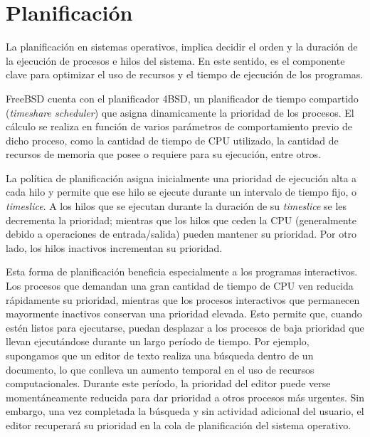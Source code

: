 \section{Planificación}

La planificación en sistemas operativos, implica decidir el orden y la duración de la ejecución de procesos e hilos del sistema. En este sentido, es el componente clave para optimizar el uso de recursos y el tiempo de ejecución de los programas.\par

FreeBSD cuenta con el planificador 4BSD, un planificador de tiempo compartido (\textit{timeshare scheduler}) que asigna dinamicamente la prioridad de los procesos. El cálculo se realiza en función de varios parámetros de comportamiento previo de dicho proceso, como la cantidad de tiempo de CPU utilizado, la cantidad de recursos de memoria que posee o requiere para su ejecución, entre otros.\par

La política de planificación asigna inicialmente una prioridad de ejecución alta a cada hilo y permite que ese hilo se ejecute durante un intervalo de tiempo fijo, o \textit{timeslice}. A los hilos que se ejecutan durante la duración de su \textit{timeslice} se les decrementa la prioridad; mientras que los hilos que ceden la CPU (generalmente debido a operaciones de entrada/salida) pueden mantener su prioridad. Por otro lado, los hilos inactivos incrementan su prioridad.\par

Esta forma de planificación beneficia especialmente a los programas interactivos. Los procesos que demandan una gran cantidad de tiempo de CPU ven reducida rápidamente su prioridad, mientras que los procesos interactivos que permanecen mayormente inactivos conservan una prioridad elevada. Esto permite que, cuando estén listos para ejecutarse, puedan desplazar a los procesos de baja prioridad que llevan ejecutándose durante un largo período de tiempo. Por ejemplo, supongamos que un editor de texto realiza una búsqueda dentro de un documento, lo que conlleva un aumento temporal en el uso de recursos computacionales. Durante este período, la prioridad del editor puede verse momentáneamente reducida para dar prioridad a otros procesos más urgentes. Sin embargo, una vez completada la búsqueda y sin actividad adicional del usuario, el editor recuperará su prioridad en la cola de planificación del sistema operativo.\par


